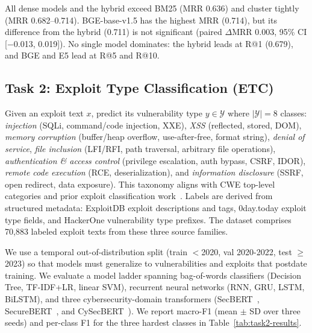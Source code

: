 \documentclass{article}
\begin{document}
All dense models and the hybrid exceed BM25 (MRR 0.636) and cluster tightly (MRR 0.682--0.714). BGE-base-v1.5 has the highest MRR (0.714), but its difference from the hybrid (0.711) is not significant (paired $\Delta$MRR 0.003, 95\% CI [$-$0.013, 0.019]). No single model dominates: the hybrid leads at R@1 (0.679), and BGE and E5 lead at R@5 and R@10.

\subsection{Task 2: Exploit Type Classification (ETC)}
\label{sec:task2}

Given an exploit text $x$, predict its vulnerability type $y \in \mathcal{Y}$ where $|\mathcal{Y}| = 8$ classes: \emph{injection} (SQLi, command/code injection, XXE), \emph{XSS} (reflected, stored, DOM), \emph{memory corruption} (buffer/heap overflow, use-after-free, format string), \emph{denial of service}, \emph{file inclusion} (LFI/RFI, path traversal, arbitrary file operations), \emph{authentication \& access control} (privilege escalation, auth bypass, CSRF, IDOR), \emph{remote code execution} (RCE, deserialization), and \emph{information disclosure} (SSRF, open redirect, data exposure). This taxonomy aligns with CWE top-level categories and prior exploit classification work~\citep{ampel2020dtl,ampel2024misq}. Labels are derived from structured metadata: ExploitDB exploit descriptions and tags, 0day.today exploit type fields, and HackerOne vulnerability type prefixes. The dataset comprises 70,883 labeled exploit texts from these three source families.

We use a temporal out-of-distribution split (train $<$2020, val 2020-2022, test $\geq$2023) so that models must generalize to vulnerabilities and exploits that postdate training. We evaluate a model ladder spanning bag-of-words classifiers (Decision Tree, TF-IDF+LR, linear SVM), recurrent neural networks (RNN, GRU, LSTM, BiLSTM), and three cybersecurity-domain transformers (SecBERT~\citep{secbert2022}, SecureBERT~\citep{aghaei2023securebert}, and CySecBERT~\citep{bayer2024cysecbert}). We report macro-F1 (mean $\pm$ SD over three seeds) and per-class F1 for the three hardest classes in Table~\ref{tab:task2-results}.
\end{document}
